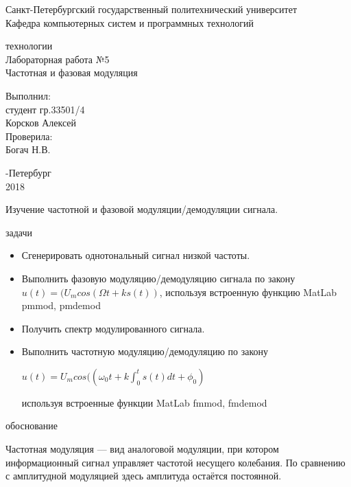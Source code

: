 \documentclass[a4paper,12pt]{article}
\begin{document}
\begin{center}
Санкт-Петербургский государственный политехнический университет
\\Кафедра компьютерных систем и программных технологий
\end{center}
\vspace*{10em plus .6em minus .5em}

\begin{center}
{ технологии
\\Лабораторная работа №5
\\Частотная и фазовая модуляция}
\end{center}

\vspace*{5em plus .6em minus .5em}
\begin{flushright}
Выполнил:\\студент гр.33501/4\\Корсков Алексей\\Проверила:\\Богач Н.В.
\end{flushright}

\vspace*{15em plus .6em minus .5em}
\begin{center}
{-Петербург
\\2018}
\end{center}
\pagestyle{empty}
\newpage
\pagestyle{plain}
{}

Изучение частотной и фазовой модуляции/демодуляции сигнала.

{ задачи}

\begin{itemize}
	\item Сгенерировать однотональный сигнал низкой частоты.
	\item Выполнить фазовую модуляцию/демодуляцию сигнала по закону $u(t)=(U_mcos (\Omega t+ks(t))$, используя встроенную функцию MatLab pmmod, pmdemod
	\item Получить спектр модулированного сигнала.
	\item Выполнить частотную модуляцию/демодуляцию по закону
	
	$u(t)=U_mcos((\omega_0 t+k\int_{0}^{t}s(t)dt+\phi_0)$
	
	используя встроенные функции MatLab fmmod, fmdemod
\end{itemize}

{ обоснование}

Частотная модуляция — вид аналоговой модуляции, при котором информационный сигнал управляет частотой несущего колебания. По сравнению с амплитудной модуляцией здесь амплитуда остаётся постоянной. 
\end{document}
